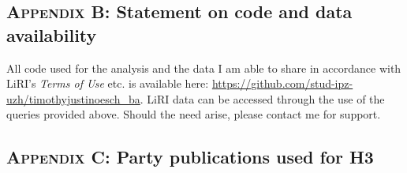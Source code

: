 \documentclass[11pt,a4paper]{article}
\begin{document}
\normalsize

\newpage

\subsection*{\textsc{Appendix B}: Statement on code and data availability}
All code used for the analysis and the data I am able to share in accordance with LiRI’s \textit{Terms of Use} etc. is available here: \href{https://github.com/stud-ipz-uzh/timothyjustinoesch_ba}{https://github.com/stud-ipz-uzh/timothyjustinoesch\_ba}. LiRI data can be accessed through the use of the queries provided above. Should the need arise, please contact me for support.


\newpage
\subsection*{\textsc{Appendix C}: Party publications used for H3 }
\end{document}
